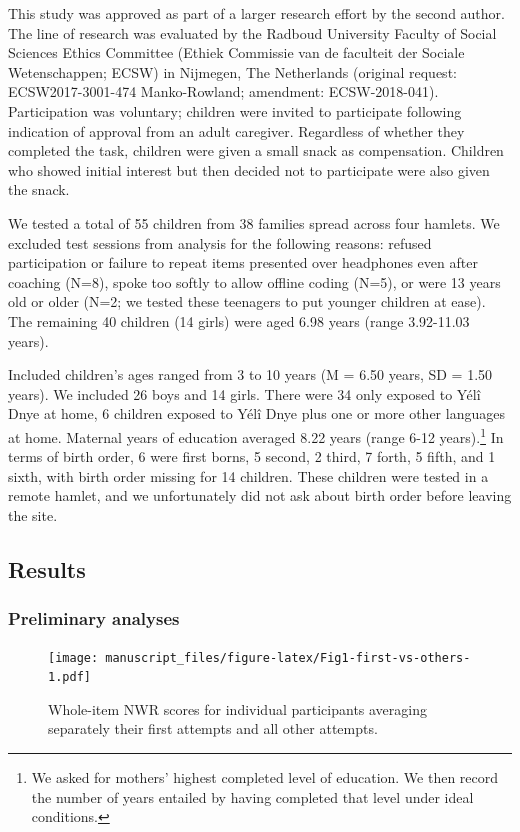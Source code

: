 \documentclass[english,,man,floatsintext]{apa6}
\begin{document}
This study was approved as part of a larger research effort by the second author. The line of research was evaluated by the Radboud University Faculty of Social Sciences Ethics Committee (Ethiek Commissie van de faculteit der Sociale Wetenschappen; ECSW) in Nijmegen, The Netherlands (original request: ECSW2017-3001-474 Manko-Rowland; amendment: ECSW-2018-041). Participation was voluntary; children were invited to participate following indication of approval from an adult caregiver. Regardless of whether they completed the task, children were given a small snack as compensation. Children who showed initial interest but then decided not to participate were also given the snack.

We tested a total of 55 children from 38 families spread across four hamlets. We excluded test sessions from analysis for the following reasons: refused participation or failure to repeat items presented over headphones even after coaching (N=8), spoke too softly to allow offline coding (N=5), or were 13 years old or older (N=2; we tested these teenagers to put younger children at ease). The remaining 40 children (14 girls) were aged 6.98 years (range 3.92-11.03 years).

Included children's ages ranged from 3 to 10 years (M = 6.50 years, SD = 1.50 years). We included 26 boys and 14 girls. There were 34 only exposed to Yélî Dnye at home, 6 children exposed to Yélî Dnye plus one or more other languages at home. Maternal years of education averaged 8.22 years (range 6-12 years).\footnote{We asked for mothers' highest completed level of education. We then record the number of years entailed by having completed that level under ideal conditions.} In terms of birth order, 6 were first borns, 5 second, 2 third, 7 forth, 5 fifth, and 1 sixth, with birth order missing for 14 children. These children were tested in a remote hamlet, and we unfortunately did not ask about birth order before leaving the site.

\hypertarget{results}{%
\subsection{Results}\label{results}}

\hypertarget{preliminary-analyses}{%
\subsubsection{Preliminary analyses}\label{preliminary-analyses}}

\begin{figure}
\centering
\texttt{[image: manuscript\_files/figure-latex/Fig1-first-vs-others-1.pdf]}
\caption{\label{fig:Fig1-first-vs-others}Whole-item NWR scores for individual participants averaging separately their first attempts and all other attempts.}
\end{figure}
\end{document}
